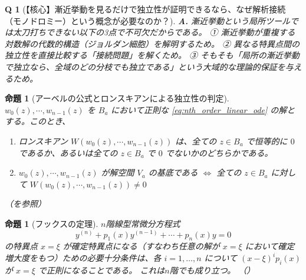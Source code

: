 \documentclass[paper=a4, fontsize=11pt]{jlreq} %
\theoremstyle{break}
\newtheorem{proposition}[theorem]{命題}
\theoremstyle{qa}
\newtheorem*{Q}{Q}
\theoremstyle{remark} %
\begin{document}
\begin{Q}[【核心】漸近挙動を見るだけで独立性が証明できるなら、なぜ解析接続（モノドロミー）という概念が必要なのか？]
\textbf{A.} 漸近挙動という局所ツールでは太刀打ちできない以下の3点で不可欠だからである。
① 漸近挙動が重複する対数解の代数的構造（ジョルダン細胞）を解明するため。
② 異なる特異点間の独立性を直接比較する「接続問題」を解くため。
③ そもそも「局所の漸近挙動で独立なら、全域のどの分枝でも独立である」という大域的な理論的保証を与えるため。
\end{Q}
\begin{proposition}[アーベルの公式とロンスキアンによる独立性の判定]\label{prop:wronskian_independence}
    $w_{0}(z),\cdots,w_{n-1}(z)$ を $B_{a}$ において正則な \eqref{eq:nth_order_linear_ode} の解とする。このとき、
    \begin{enumerate}
        \item[(i)] ロンスキアン $W(w_{0}(z),\cdots,w_{n-1}(z))$ は、全ての $z\in B_{a}$ で恒等的に $0$ であるか、あるいは全ての $z\in B_{a}$ で $0$ でないかのどちらかである。
        \item[(ii)] $w_{0}(z),\cdots,w_{n-1}(z)$ が解空間 $V_{a}$ の基底である $\iff$ 全ての $z\in B_{a}$ に対して $W(w_{0}(z),\cdots,w_{n-1}(z)) \neq 0$
    \end{enumerate}
    （\cite[p.78 定理11.3]{book:takano}を参照）
\end{proposition}
\begin{proposition}[フックスの定理]\label{prop:fuchs_theorem_n}
    $n$階線型常微分方程式
    \begin{equation}
        y^{(n)} + p_{1}(x)y^{(n-1)} + \cdots + p_{n}(x)y = 0 \label{eq:n-ode}
    \end{equation}
    の特異点 $x=\xi$ が確定特異点になる（すなわち任意の解が $x=\xi$ において確定増大度をもつ）ための必要十分条件は、各 $i=1,\dots,n$ について $(x-\xi)^{i}p_{i}(x)$ が $x=\xi$ で正則になることである。
    これは$n$階でも成り立つ。
    （\cite[定理13.4 p.128]{book:takano}）
\end{proposition}
\end{document}
